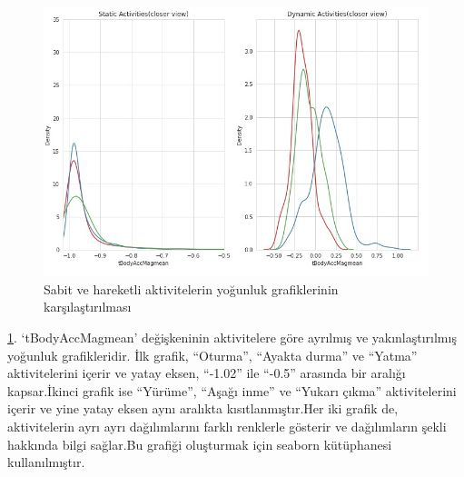 \documentclass[12pt,twoside]{deuthesis}
\begin{document}
\begin{figure}
\includegraphics[width=1\linewidth,height=0.45\textheight]{figure/tbodyaccmag plot} \caption{Sabit ve hareketli aktivitelerin yoğunluk grafiklerinin karşılaştırılması}\label{fig:tbodyaccmagplot2}
\end{figure}
\ref{fig:tbodyaccmagplot2}. `tBodyAccMagmean' değişkeninin aktivitelere göre ayrılmış ve yakınlaştırılmış yoğunluk grafikleridir. İlk grafik, ``Oturma'', ``Ayakta durma'' ve ``Yatma'' aktivitelerini içerir ve yatay eksen, ``-1.02'' ile ``-0.5'' arasında bir aralığı kapsar.İkinci grafik ise ``Yürüme'', ``Aşağı inme'' ve ``Yukarı çıkma'' aktivitelerini içerir ve yine yatay eksen aynı aralıkta kısıtlanmıştır.Her iki grafik de, aktivitelerin ayrı ayrı dağılımlarını farklı renklerle gösterir ve dağılımların şekli hakkında bilgi sağlar.Bu grafiği oluşturmak için seaborn kütüphanesi kullanılmıştır.
\end{document}
